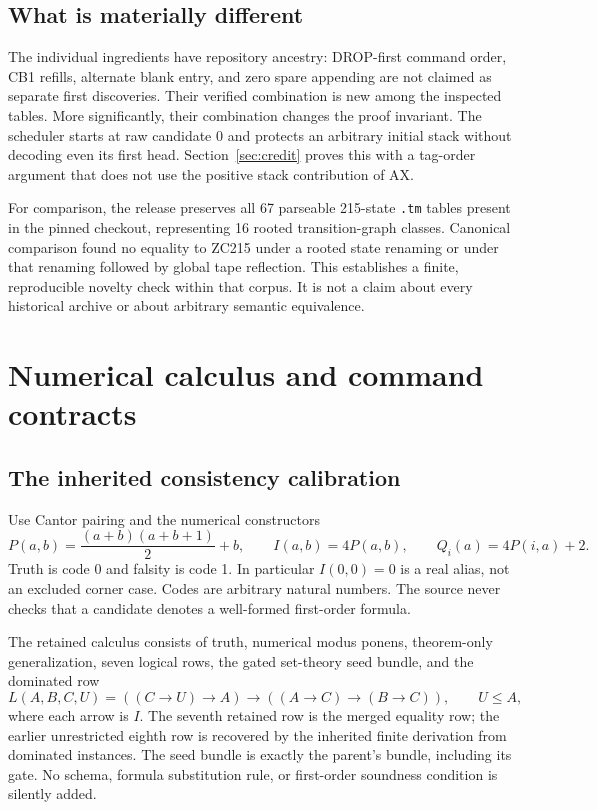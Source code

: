 \documentclass[11pt,a4paper]{article}
\theoremstyle{remark}\newtheorem{remark}[theorem]{Remark}
\begin{document}
\subsection{What is materially different}

The individual ingredients have repository ancestry: DROP-first command order, CB1 refills, alternate blank entry, and zero spare appending are not claimed as separate first discoveries. Their verified combination is new among the inspected tables. More significantly, their combination changes the proof invariant. The scheduler starts at raw candidate 0 and protects an arbitrary initial stack without decoding even its first head. Section~\ref{sec:credit} proves this with a tag-order argument that does not use the positive stack contribution of AX.

For comparison, the release preserves all 67 parseable 215-state \texttt{.tm} tables present in the pinned checkout, representing 16 rooted transition-graph classes. Canonical comparison found no equality to ZC215 under a rooted state renaming or under that renaming followed by global tape reflection. This establishes a finite, reproducible novelty check within that corpus. It is not a claim about every historical archive or about arbitrary semantic equivalence.

\section{Numerical calculus and command contracts}\label{sec:calculus}

\subsection{The inherited consistency calibration}

Use Cantor pairing and the numerical constructors
\[
 P(a,b)=\frac{(a+b)(a+b+1)}2+b,\qquad
 I(a,b)=4P(a,b),\qquad Q_i(a)=4P(i,a)+2.
\]
Truth is code 0 and falsity is code 1. In particular $I(0,0)=0$ is a real alias, not an excluded corner case. Codes are arbitrary natural numbers. The source never checks that a candidate denotes a well-formed first-order formula.

The retained calculus consists of truth, numerical modus ponens, theorem-only generalization, seven logical rows, the gated set-theory seed bundle, and the dominated row
\[
 L(A,B,C,U)=((C\mathbin{\to}U)\mathbin{\to}A)
       \mathbin{\to}((A\mathbin{\to}C)\mathbin{\to}(B\mathbin{\to}C)),
 \qquad U\leq A,
\]
where each arrow is $I$. The seventh retained row is the merged equality row; the earlier unrestricted eighth row is recovered by the inherited finite derivation from dominated instances. The seed bundle is exactly the parent's bundle, including its gate. No schema, formula substitution rule, or first-order soundness condition is silently added.
\end{document}
